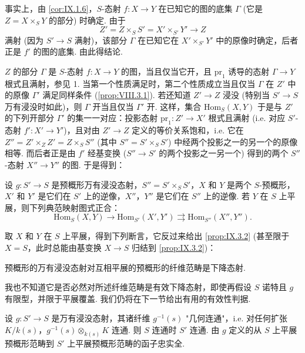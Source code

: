 事实上，由 \ref{cor:IX.1.6}，$S$-态射 $f \colon X \to Y$ 在已知它的图的底集 $\Gamma$ (它是 $Z = X \times_S Y$ 的部分) 时确定. 由于
\[
Z' = Z \times_S S' = X' \times_{S'} Y' \longrightarrow Z
\]
满射 (因为 $S' \to S$ 满射)，该部分 $\Gamma$ 在已知它在 $X' \times_{S'} Y'$ 中的原像时确定，后者正是 $f'$ 的图的底集. 由此得结论.

$Z$ 的部分 $\Gamma$ 是 $S$-态射 $f \colon X \to Y$ 的图，当且仅当它开，且 $\mathrm{pr}_1$ 诱导的态射 $\Gamma \to Y$ 根式且满射，参见 1. 当第一个性质满足时，第二个性质成立当且仅当 $\Gamma$ 在 $Z'$ 中的原像 $\Gamma'$ 满足同样条件 (\cref{prop:VIII.3.1}). 若还知道 $Z' \to Z$ 浸没 (特别当 $S' \to S$ 万有浸没时如此)，则 $\Gamma$ 开当且仅当 $\Gamma'$ 开. 这样，集合 $\mathrm{Hom}_S(X, Y)$ 于是与 $Z'$ 的下列开部分 $\Gamma'$ 的集一一对应：投影态射 $\mathrm{pr}_1 \colon Z' \to X'$ 根式且满射 (i.e. 对应 $S'$-态射 $f' \colon X' \to Y'$)，且对由 $Z' \to Z$ 定义的等价关系饱和，i.e. 它在 $Z'' = Z' \times_Z Z' = Z \times_S S''$ (其中 $S'' = S' \times_S S'$) 中经两个投影之一的另一个的原像相等. 而后者正是由 $f'$ 经基变换 ($S'' \to S'$ 的两个投影之一另一个) 得到的两个 $S''$-态射 $X'' \to Y''$ 的图. 于是得到：

\begin{proposition}\label{prop:IX.3.2}
设 $g \colon S' \to S$ 是预概形万有浸没态射，$S'' = S' \times_S S'$，$X$ 和 $Y$ 是两个 $S$-预概形，$X'$ 和 $Y'$ 是它们在 $S'$ 上的逆像，$X''$，$Y''$ 是它们在 $S''$ 上的逆像. 若 $Y$ 在 $S$ 上平展，则下列典范映射图式正合：
\[
\mathrm{Hom}_S(X, Y) \longrightarrow \mathrm{Hom}_{S'}(X', Y') \rightrightarrows \mathrm{Hom}_{S''}(X'', Y'').
\]
\end{proposition}

取 $X$ 和 $Y$ 在 $S$ 上平展，得到下列断言，它反过来给出 \ref{prop:IX.3.2} (甚至限于 $X = S$，此时总能由基变换 $X \to S$ 归结到 \ref{prop:IX.3.2})：

\begin{corollary}\label{cor:IX.3.3}
预概形的万有浸没态射对互相平展的预概形的纤维范畴是下降态射.
\end{corollary}

我也不知道它是否必然对所述纤维范畴是有效下降态射，即使再假设 $S$ 诺特且 $g$ 有限型，并限于平展覆盖. 我们仍将在下一节给出有用的有效性判据.

\begin{corollary}\label{cor:IX.3.4}
设 $g \colon S' \to S$ 是万有浸没态射，其诸纤维 $g^{-1}(s)$ "几何连通"，i.e. 对任何扩张 $K/k(s)$，$g^{-1}(s) \otimes_{k(s)} K$ 连通. 则 $S$ 连通时 $S'$ 连通. 由 $g$ 定义的从 $S$ 上平展预概形范畴到 $S'$ 上平展预概形范畴的函子忠实全.
\end{corollary}

